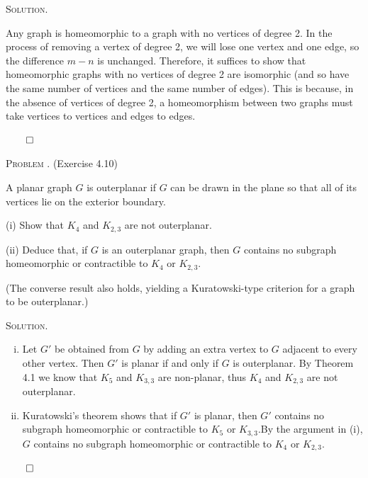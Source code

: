 \documentclass[12pt, a4paper, oneside]{ctexart}
\newcounter{problemname}
\newenvironment{problem}{\begin{framed}\stepcounter{problemname}\par\noindent\textsc{Problem \arabic{problemname}. }}{\end{framed}\par}
\newenvironment{solution}{%
	\par\noindent\textsc{Solution. }\ignorespaces
}{%
	\hfill$\qed$\par
}
\begin{document}
	\begin{solution}
       
        Any graph is homeomorphic to a graph with no vertices of degree 2. 
        In the process of removing a vertex of degree 2, we will lose one vertex and one edge, 
        so the difference $m - n$ is unchanged. Therefore, it suffices to show that 
        homeomorphic graphs with no vertices of degree 2 are isomorphic 
        (and so have the same number of vertices and the same number of edges). 
        This is because, in the absence of vertices of degree 2, a homeomorphism 
        between two graphs must take vertices to vertices and edges to edges.

        
	\end{solution}
	
	
	
	\begin{problem}
        (Exercise 4.10) 
        
        A planar graph \( G \) is outerplanar if \( G \) can be drawn in the plane so that all of its vertices lie on the exterior boundary.

        (i) Show that \( K_4 \) and \( K_{2,3} \) are not outerplanar.

        (ii) Deduce that, if \( G \) is an outerplanar graph, then \( G \) contains no subgraph homeomorphic or contractible to \( K_4 \) or \( K_{2,3} \).

        (The converse result also holds, yielding a Kuratowski-type criterion for a graph to be outerplanar.)

		
	\end{problem}
	
	\begin{solution}
        
        \begin{enumerate}[(i)]
            \item Let $G'$ be obtained from $G$ by adding an extra vertex to $G$ adjacent to every other 
        vertex. Then $G'$ is planar if and only if $G$ is outerplanar. By Theorem 4.1 we know that 
        $K_5$ and $K_{3,3}$ are non-planar, thus \( K_4 \) and \( K_{2,3} \) are not outerplanar.
            \item Kuratowski's theorem shows that if \( G' \) is planar, then \( G' \) 
            contains no subgraph homeomorphic or contractible to \( K_5 \) or \( K_{3,3} \).By the
            argument in (i), \( G \) contains no subgraph homeomorphic or contractible to \( K_4 \) or \( K_{2,3} \).
            
        \end{enumerate}

		
	\end{solution}
\end{document}
